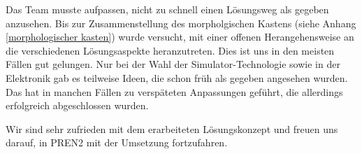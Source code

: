 \documentclass[../main.tex]{subfiles}
\begin{document}
Das Team musste aufpassen, nicht zu schnell einen Lösungsweg als gegeben anzusehen. Bis zur Zusammenstellung des morpholgischen Kastens (siehe Anhang \ref{morphologischer kasten}) wurde versucht, mit einer offenen Herangehensweise an die verschiedenen Lösungsaspekte heranzutreten. Dies ist uns in den meisten Fällen gut gelungen. Nur bei der Wahl der Simulator-Technologie sowie in der Elektronik gab es teilweise Ideen, die schon früh als gegeben angesehen wurden. Das hat in manchen Fällen zu verspäteten Anpassungen geführt, die allerdings erfolgreich abgeschlossen wurden.

Wir sind sehr zufrieden mit dem erarbeiteten Lösungskonzept und freuen uns darauf, in PREN2 mit der Umsetzung fortzufahren.
\end{document}
